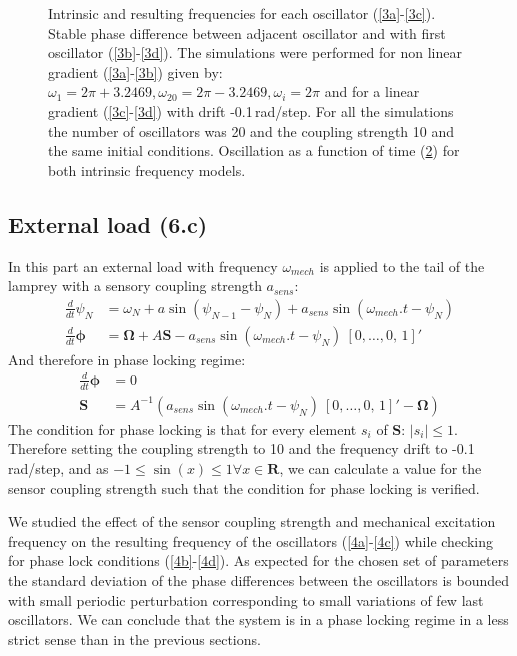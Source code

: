 \documentclass[a4paper]{scrartcl}
\begin{document}
\begin{figure}[!b]
\begin{subfigure}[b]{\textwidth}
		\caption{}\label{3e}
	\end{subfigure}
	\caption{Intrinsic and resulting frequencies for each oscillator (\ref{3a}-\ref{3c}). Stable phase difference between adjacent oscillator and with first oscillator (\ref{3b}-\ref{3d}). The simulations were performed for non linear gradient (\ref{3a}-\ref{3b}) given by: $\omega_{1} = 2\pi + 3.2469 ,\omega_{20} = 2\pi - 3.2469 , \omega_{i} = 2\pi$ and for a linear gradient (\ref{3c}-\ref{3d}) with drift -0.1\,rad/step. For all the simulations the number of oscillators was 20 and the coupling strength 10 and the same initial conditions. Oscillation as a function of time (\ref{3e}) for both intrinsic frequency models.}
\end{figure}


\subsection{External load (6.c)}
In this part an external load with frequency $\omega_{mech}$ is applied to the tail of the lamprey with a sensory coupling strength $a_{sens}$:
\begin{align*}
\frac{d}{dt}\psi_N &= \omega_N + a \sin(\psi_{N-1}-\psi_N) + a_{sens} \sin(\omega_{mech}.t-\psi_N) \\
\frac{d}{dt}\mathbf{\phi} &= \mathbf{\Omega} + A \mathbf{S} - a_{sens} \sin(\omega_{mech}.t-\psi_N)\ [0, \ldots, 0,\, 1]'
\end{align*}
And therefore in phase locking regime:
\begin{align*}
\frac{d}{dt}\mathbf{\phi} &= 0\\
\mathbf{S} &= A^{-1}(a_{sens}\sin(\omega_{mech}.t-\psi_N)\ [0, \ldots, 0,\, 1]'-\mathbf{\Omega})
\end{align*}
The condition for phase locking is that for every element $s_i$ of $\mathbf{S}$: $|s_i|\leq1$.
Therefore setting the coupling strength to 10 and the frequency drift to -0.1\,rad/step, and as $-1\leq\sin(x)\leq1 \forall x \in \mathbf{R}$, we can calculate a value for the sensor coupling strength such that the condition for phase locking is verified.

We studied the effect of the sensor coupling strength and mechanical excitation frequency on the resulting frequency of the oscillators (\ref{4a}-\ref{4c}) while checking for phase lock conditions (\ref{4b}-\ref{4d}). As expected for the chosen set of parameters the standard deviation of the phase differences between the oscillators is bounded with small periodic perturbation corresponding to small variations of few last oscillators. We can conclude that the system is in a phase locking regime in a less strict sense than in the previous sections.
\end{document}
